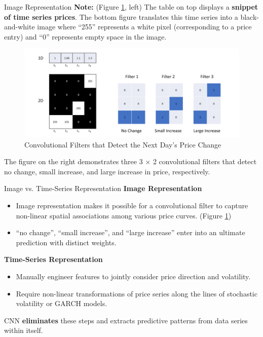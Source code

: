 \documentclass{beamer}
\begin{document}
\begin{frame}{Image Representation}
\textbf{Note:} (Figure \ref{fig:4}, left) The table on top displays a \textbf{snippet of time series prices}. The bottom figure translates this time series into a black-and-white image where “255” represents a white pixel (corresponding to a price entry) and “0” represents empty space in the image.
    \begin{figure}[h]
        \centering
        \includegraphics[width=.7\textwidth]{images/4 Convolutional Filters that Detect the Next Days Price Change.png}
        \caption{Convolutional Filters that Detect the Next Day’s Price Change}
        \label{fig:4}
    \end{figure}
The figure on the right demonstrates three 3 × 2 convolutional filters that detect no change, small increase, and large increase in price, respectively.
\end{frame}

\begin{frame}{Image vs. Time-Series Representation}
\textbf{Image Representation}
    \begin{itemize}
        \item Image representation makes it possible for a convolutional filter to capture non-linear spatial associations among various price curves. (Figure \ref{fig:4})
        \item “no change”, “small increase”, and “large increase” enter into an ultimate prediction with distinct weights.
    \end{itemize}
\textbf{Time-Series Representation}
\begin{itemize}
    \item Manually engineer features to jointly consider price direction and volatility.
    \item Require non-linear transformations of price series along the lines of stochastic volatility or GARCH models.
\end{itemize}
CNN \textbf{eliminates} these steps and extracts predictive patterns from data series within itself.
\end{frame}
\end{document}

